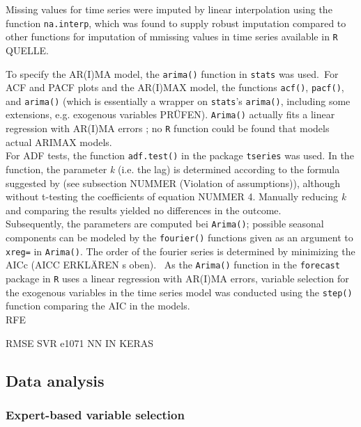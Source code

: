 \documentclass[a4paper, 11pt]{article}
\begin{document}
Missing values for time series were imputed by linear interpolation using the function \texttt{na.interp}, which was found to supply robust imputation compared to other functions for imputation of mmissing values in time series available in \texttt{R} QUELLE. 

To specify the AR(I)MA model, the \texttt{arima()} function in \texttt{stats{}} was used.\
For ACF and PACF plots and the AR(I)MAX model, the functions \texttt{acf()}, \texttt{pacf()}, and \texttt{arima()} (which is essentially a wrapper on \texttt{stats}'s \texttt{arima()}, including some extensions, e.g. exogenous variables PRÜFEN). \texttt{Arima()} actually fits a linear regression with AR(I)MA errors \citep{Hyndman.2018}; no \texttt{R} function could be found that models actual ARIMAX models.\\
For ADF tests, the function \texttt {adf.test()} in the package \texttt{tseries} was used. In the function, the parameter \textit{k} (i.e. the lag) is determined according to the formula suggested by \cite{Vogel.2015} (see subsection NUMMER (Violation of assumptions)), although without t-testing the coefficients of equation NUMMER 4. Manually reducing \textit{k} and comparing the results yielded no differences in the outcome.\\

Subsequently, the parameters are computed bei \texttt{Arima()}; possible seasonal components can be modeled by the \texttt{fourier()} functions given as an argument to \texttt{xreg=} in \texttt{Arima()}. The order of the fourier series is determined by minimizing the AICc (AICC ERKLÄREN s oben). \
As the \texttt{Arima()} function in the \texttt{forecast} package in \texttt{R} uses a linear regression with AR(I)MA errors, variable selection for the exogenous variables in the time series model was conducted using the \texttt{step()} function comparing the AIC in the models.\\


RFE

RMSE
SVR e1071
NN IN KERAS


\subsection{Data analysis}

\subsubsection{Expert-based variable selection}
\end{document}
